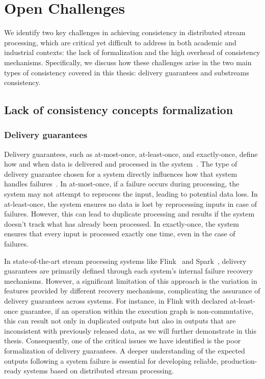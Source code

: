 \section{Open Challenges}
\label{thesis-intro-challenges}

We identify two key challenges in achieving consistency in distributed stream processing, which are critical yet difficult to address in both academic and industrial contexts: the lack of formalization and the high overhead of consistency mechanisms. Specifically, we discuss how these challenges arise in the two main types of consistency covered in this thesis: delivery guarantees and substreams consistency.

\subsection{Lack of consistency concepts formalization}

\subsubsection{Delivery guarantees}

Delivery guarantees, such as at-most-once, at-least-once, and exactly-once, define how and when data is delivered and processed in the system~\cite{fragkoulis2024survey, carbone2018scalable, Akidau:2013:MFS:2536222.2536229}. The type of delivery guarantee chosen for a system directly influences how that system handles failures~\cite{zhang2024survey, silvestre2021clonos, wang2021consistency}. In at-most-once, if a failure occurs during processing, the system may not attempt to reprocess the input, leading to potential data loss. In at-least-once, the system ensures no data is lost by reprocessing inputs in case of failures. However, this can lead to duplicate processing and results if the system doesn't track what has already been processed. In exactly-once, the system ensures that every input is processed exactly one time, even in the case of failures.

In state-of-the-art stream processing systems like Flink~\cite{Carbone:2017:SMA:3137765.3137777} and Spark~\cite{Zaharia:2012:DSE:2342763.2342773}, delivery guarantees are primarily defined through each system's internal failure recovery mechanisms. However, a significant limitation of this approach is the variation in features provided by different recovery mechanisms, complicating the assurance of delivery guarantees across systems. For instance, in Flink with declared at-least-once guarantee, if an operation within the execution graph is non-commutative, this can result not only in duplicated outputs but also in outputs that are inconsistent with previously released data, as we will further demonstrate in this thesis. Consequently, one of the critical issues we have identified is the poor formalization of delivery guarantees. A deeper understanding of the expected outputs following a system failure is essential for developing reliable, production-ready systems based on distributed stream processing.

